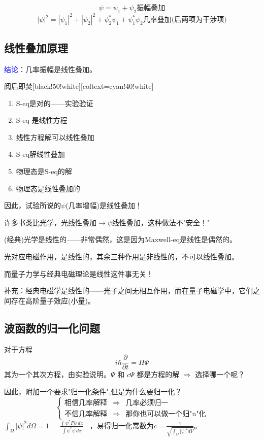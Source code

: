 $$\psi=\psi_1+\psi_2 \text{振幅叠加}$$
$$|\psi|^2=|\psi_1|^2+|\psi_2|^2+\psi_2^*\psi_1+\psi_1^*\psi_2 \text{几率叠加(后两项为干涉项)}$$

\subsection{线性叠加原理}
\textcolor{blue}{结论}：几率振幅是线性叠加。

\begin{ascolorbox5}[]{阅后即焚}[black!50!white][coltext=cyan!40!white]
    \begin{enumerate}
    \item S-eq是对的——实验验证
    \item S-eq 是线性方程
    \item 线性方程解可以线性叠加
    \item S-eq解线性叠加
    \item 物理态是S-eq的解
    \item 物理态是线性叠加的
    \end{enumerate}
    因此，试验所说的$\psi$(几率增幅)是线性叠加！
    
    许多书类比光学，光线性叠加$\rightarrow \psi$线性叠加，这种做法不"安全！"

    (经典)光学是线性的——非常偶然，这是因为Maxwell-eq是线性是偶然的。

    光对应电磁作用，是线性的，其余三种作用是非线性的，不可以线性叠加。

    而量子力学与经典电磁理论是线性这件事无关！

    补充：经典电磁学是线性的——光子之间无相互作用，而在量子电磁学中，它们之间存在高阶量子效应(小量)。

\end{ascolorbox5}

\subsection{波函数的归一化问题}
    对于方程$$ i\hbar\frac{\partial}{\partial t} = H \Psi $$
    其为一个其次方程，由实验说明。$\Psi$ 和 $c\Psi$ 都是方程的解 $\Rightarrow$ 选择哪一个呢？

    因此，附加一个要求"归一化条件",但是为什么要归一化？
$$
\left\{ \begin{matrix}
    \text{相信几率解释}& \Rightarrow& \text{几率必须归一}\\
    \text{不信几率解释}& \Rightarrow& \text{那你也可以做一个归"n"化}
\end{matrix}\right.
 $$
$\int_{\Omega}{|\psi| ^2 d\Omega}=1$  \, \,\, $\frac{\int{\psi ^* F\psi \,dx}}{\int{\psi ^* \psi \,dx}}$ \, ，易得归一化常数为$c=\frac{1}{\sqrt{\int_{\Omega}{|\psi|^2 dV}}}$。

